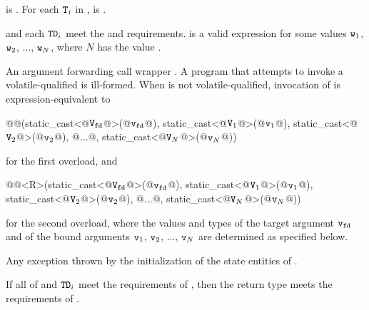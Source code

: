 \begin{itemdescr}
\pnum
\mandates
{} is . For each $\texttt{T}_i$
in ,  is .

\pnum
\expects
{} and each $\texttt{TD}_i$ meet
the  and  requirements.
 is a valid expression for some
values $\texttt{w}_1$, $\texttt{w}_2$, $\dotsc{}$, $\texttt{w}_N$, where
$N$ has the value .

\pnum
\returns
An argument forwarding call wrapper .
A program that attempts to invoke a volatile-qualified 
is ill-formed.
When  is not volatile-qualified, invocation of
is expression-equivalent to
\begin{codeblock}
@@(static_cast<@$\texttt{V}_{\texttt{fd}}$@>(@$\texttt{v}_{\texttt{fd}}$@),
       static_cast<@$\texttt{V}_1$@>(@$\texttt{v}_1$@), static_cast<@$\texttt{V}_2$@>(@$\texttt{v}_2$@), @$\dotsc$@, static_cast<@$\texttt{V}_N$@>(@$\texttt{v}_N$@))
\end{codeblock}
for the first overload, and
\begin{codeblock}
@@<R>(static_cast<@$\texttt{V}_{\texttt{fd}}$@>(@$\texttt{v}_{\texttt{fd}}$@),
          static_cast<@$\texttt{V}_1$@>(@$\texttt{v}_1$@), static_cast<@$\texttt{V}_2$@>(@$\texttt{v}_2$@), @$\dotsc$@, static_cast<@$\texttt{V}_N$@>(@$\texttt{v}_N$@))
\end{codeblock}
for the second overload,
where the values and types of the target argument $\texttt{v}_{\texttt{fd}}$ and
of the bound arguments
$\texttt{v}_1$, $\texttt{v}_2$, $\dotsc$, $\texttt{v}_N$ are determined as specified below.

\pnum
\throws
Any exception thrown by the initialization of
the state entities of .

\pnum
\begin{note}
If all of  and $\texttt{TD}_i$ meet
the requirements of , then
the return type meets the requirements of .
\end{note}
\end{itemdescr}

